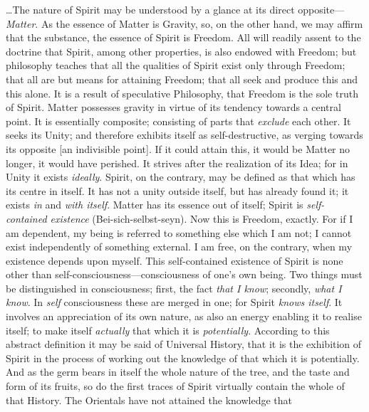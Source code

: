 \snip


\ldots The nature of Spirit may be understood by a glance at
its direct opposite---\textit{Matter}. As the essence of Matter is
Gravity, so, on the other hand, we may affirm that the substance, the
essence of Spirit is Freedom. All will readily assent to the
doctrine that Spirit, among other properties, is also endowed with
Freedom; but philosophy teaches that all the qualities of Spirit exist
only through Freedom; that all are but means for attaining Freedom;
that all seek and produce this and this alone. It is a result of
speculative Philosophy, that Freedom is the sole truth of Spirit.
Matter possesses gravity in virtue of its tendency towards a central
point. It is essentially composite; consisting of parts that
\textit{exclude} each other. It seeks its Unity; and therefore
exhibits itself as self-destructive, as verging towards its opposite
[an indivisible point]. If it could attain this, it would be Matter no
longer, it would have perished. It strives after the realization of
its Idea; for in Unity it exists \textit{ideally}. Spirit, on the
contrary, may be defined as that which has its centre in itself. It
has not a unity outside itself, but has already found it; it exists
\textit{in} and \textit{with itself}. Matter has its essence out of
itself; Spirit is \textit{self-contained existence}
(Bei-sich-selbst-seyn). Now this is Freedom, exactly. For if I am
dependent, my being is referred to something else which I am not; I
cannot exist independently of something external. I am free, on the
contrary, when my existence depends upon myself. This self-contained
existence of Spirit is none other than
self-consciousness---consciousness of one's own being. Two things must
be distinguished in consciousness; first, the fact \textit{that I
know}; secondly, \textit{what I know}. In \textit{self}
consciousness these are merged in one; for Spirit \textit{knows
itself}. It involves an appreciation of its own nature, as also an
energy enabling it to realise itself; to make itself \textit{actually}
that which it is \textit{potentially}. According to this abstract
definition it may be said of Universal History, that it is the
exhibition of Spirit in the process of working out the knowledge of
that which it is potentially. And as the germ bears in itself the
whole nature of the tree, and the taste and form of its fruits, so do
the first traces of Spirit virtually contain the whole of that
History. The Orientals have not attained the knowledge that
